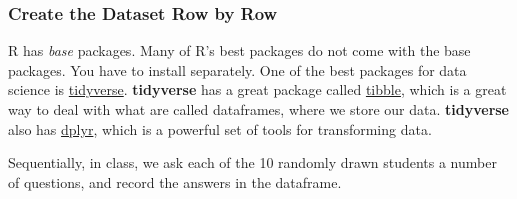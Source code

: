 \documentclass[
]{book}
\begin{document}
\hypertarget{create-the-dataset-row-by-row}{%
\subsubsection{Create the Dataset Row by Row}\label{create-the-dataset-row-by-row}}

R has \emph{base} packages. Many of R's best packages do not come with the base packages. You have to install separately. One of the best packages for data science is \href{https://www.tidyverse.org/}{tidyverse}. \textbf{tidyverse} has a great package called \href{https://tibble.tidyverse.org/}{tibble}, which is a great way to deal with what are called dataframes, where we store our data. \textbf{tidyverse} also has \href{https://dplyr.tidyverse.org/}{dplyr}, which is a powerful set of tools for transforming data.

Sequentially, in class, we ask each of the 10 randomly drawn students a number of questions, and record the answers in the dataframe.
\end{document}
